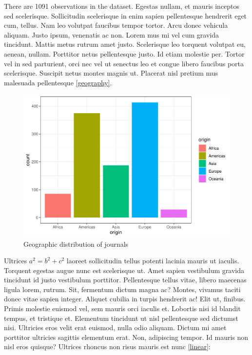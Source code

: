 \documentclass[
]{article}
\begin{document}
There are 1091 observations in the dataset. Egestas nullam, et mauris
inceptos sed scelerisque. Sollicitudin scelerisque in enim sapien
pellentesque hendrerit eget cum, tellus. Nam leo volutpat faucibus
tempor tortor. Arcu donec vehicula aliquam. Justo ipsum, venenatis ac
non. Lorem mus mi vel cum gravida tincidunt. Mattis metus rutrum amet
justo. Scelerisque leo torquent volutpat eu, aenean, nullam. Porttitor
netus pellentesque justo. Id etiam molestie per. Tortor vel in sed
parturient, orci nec vel ut senectus leo et congue libero faucibus porta
scelerisque. Suscipit netus montes magnis ut. Placerat nisl pretium mus
malesuada pellentesque \autoref{geography}.

\begin{figure}
\centering
\includegraphics{journals_files/figure-latex/image-1.pdf}
\caption{Geographic distribution of journals \label{geography}}
\end{figure}

Ultrices \(a^{2} = b^{2} + c^{2}\) laoreet sollicitudin tellus potenti
lacinia mauris ut iaculis. Torquent egestas augue nunc est scelerisque
ut. Amet sapien vestibulum gravida tincidunt id justo vestibulum
porttitor. Pellentesque tellus vitae, libero maecenas ligula lorem,
rutrum. Sit, fermentum dictum magna ac? Montes, vivamus taciti donec
vitae sapien integer. Aliquet cubilia in turpis hendrerit ac! Elit ut,
finibus. Primis molestie euismod vel, sem mauris orci iaculis et.
Lobortis nisi id blandit tempus, et tristique et. Elementum tincidunt ut
nisl pellentesque sed dictumst nisi. Ultricies eros velit erat euismod,
nulla odio aliquam. Dictum mi amet porttitor ultricies sagittis
elementum erat. Non, adipiscing tempor. Id mauris non nisl eros quisque?
Ultrices rhoncus non risus mauris est nunc \autoref{linear}:
\end{document}
